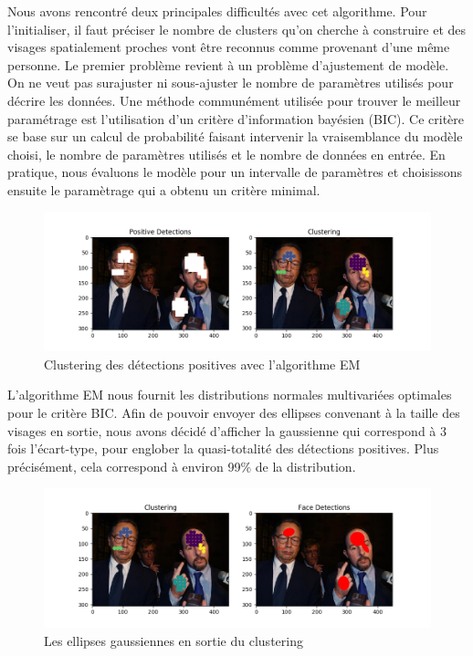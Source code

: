 \documentclass[a4paper,11pt]{article}
\begin{document}
Nous avons rencontré deux principales difficultés avec cet algorithme. 
Pour l'initialiser, il faut préciser le nombre de clusters qu'on cherche à construire et des visages spatialement proches vont être reconnus comme provenant d'une même personne.
Le premier problème revient à un problème d'ajustement de modèle. On ne veut pas surajuster ni sous-ajuster le nombre de paramètres utilisés pour décrire les données.
Une méthode communément utilisée pour trouver le meilleur paramétrage est l'utilisation d'un critère d'information bayésien (BIC).
Ce critère se base sur un calcul de probabilité faisant intervenir la vraisemblance du modèle choisi, le nombre de paramètres utilisés et le nombre de données en entrée.
En pratique, nous évaluons le modèle pour un intervalle de paramètres et choisissons ensuite le paramètrage qui a obtenu un critère minimal.
\begin{figure}[H]
\begin{center}
    \includegraphics[scale=0.5]{clustering_presentation_1.png}
    \caption{Clustering des détections positives avec l'algorithme EM} \end{center}
\end{figure}
L'algorithme EM nous fournit les distributions normales multivariées optimales pour le critère BIC.
Afin de pouvoir envoyer des ellipses convenant à la taille des visages en sortie, nous avons décidé d'afficher la gaussienne qui correspond à 3 fois l'écart-type, pour englober la quasi-totalité des détections positives.
Plus précisément, cela correspond à environ 99\% de la distribution.
\begin{figure}[H]
\begin{center}
    \includegraphics[scale=0.5]{clustering_presentation_2.png}
    \caption{Les ellipses gaussiennes en sortie du clustering} \end{center}
\end{figure}
\end{document}
